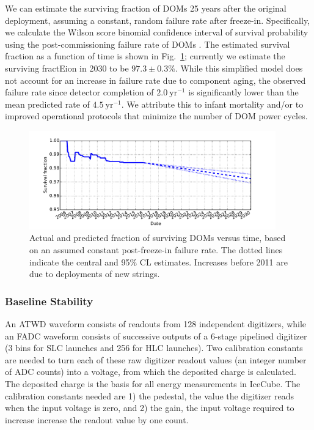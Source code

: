We can estimate the surviving fraction of DOMs 25 years after the original
deployment, assuming a constant, random failure rate after freeze-in.
Specifically, we calculate the Wilson score binomial confidence interval of
survival probability using the post-commissioning failure rate of DOMs
\cite{Wilson_Score}.  The estimated survival fraction as a function of
time is shown in Fig.~\ref{fig:dom_survival}; currently we estimate the
surviving fractEion in 2030 to be $97.3\pm0.3\%$.  While this simplified
model does not account for an increase in failure rate due to component aging, the
observed failure rate since detector completion of $2.0~\mathrm{yr}^{-1}$ is
significantly lower than the mean predicted rate of $4.5~\mathrm{yr}^{-1}$.  We attribute
this to infant mortality and/or to improved operational protocols that
minimize the number of DOM power cycles.

\begin{figure}[!h]
 \centering
 \includegraphics[width=0.95\textwidth]{graphics/dom/reliability/dom_survival.pdf}
 \caption{Actual and predicted fraction of surviving DOMs versus time, based on an assumed
 constant post-freeze-in failure rate.  The dotted lines indicate the
 central and 95\% CL estimates.  Increases before 2011 are due
 to deployments of new strings.} 
 \label{fig:dom_survival}
\end{figure}


\subsubsection{Baseline Stability}

An ATWD waveform consists of readouts from 128 independent digitizers,
while an FADC waveform consists of successive outputs of a 6-stage
pipelined digitizer (3 bins for SLC launches and 256 for HLC
launches). Two calibration constants are needed to turn each of these
raw digitizer readout values (an integer number of ADC counts) into a
voltage, from which the deposited charge is calculated. The deposited
charge is the basis for all energy measurements in IceCube. The
calibration constants needed are 1) the pedestal, the value the digitizer reads when the input voltage is zero, and
2) the gain, the input voltage required to increase increase the readout value by one count. 

